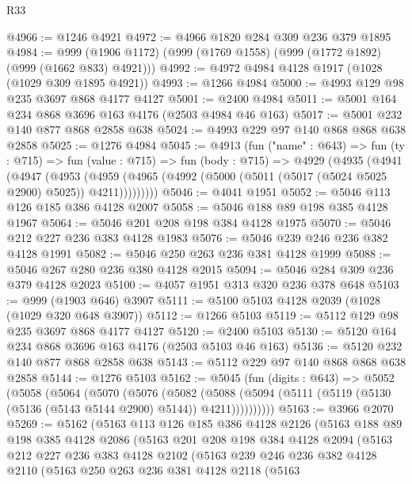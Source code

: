 \begin{lexlean}{R33}
\begin{coremodule}
@4966 := @1246 @4921
@4972 := @4966 @1820 @284 @309 @236 @379 @1895
@4984 := @999 (@1906 @1172) (@999 (@1769 @1558) (@999 (@1772 @1892) (@999 (@1662 @833) @4921)))
@4992 := @4972 @4984 @4128 @1917 (@1028 (@1029 @309 @1895 @4921))
@4993 := @1266 @4984
@5000 := @4993 @129 @98 @235 @3697 @868 @4177 @4127
@5001 := @2400 @4984
@5011 := @5001 @164 @234 @868 @3696 @163 @4176 (@2503 @4984 @46 @163)
@5017 := @5001 @232 @140 @877 @868 @2858 @638
@5024 := @4993 @229 @97 @140 @868 @868 @638 @2858
@5025 := @1276 @4984
@5045 := @4913
    (fun ("name" : @643) =>
    fun (ty : @715) =>
    fun (value : @715) =>
    fun (body : @715) =>
    @4929
      (@4935
        (@4941
          (@4947
            (@4953
              (@4959 (@4965 (@4992 (@5000 (@5011 (@5017 (@5024 @5025 @2900) @5025)) @4211)))))))))
@5046 := @4041 @1951
@5052 := @5046 @113 @126 @185 @386 @4128 @2007
@5058 := @5046 @188 @89 @198 @385 @4128 @1967
@5064 := @5046 @201 @208 @198 @384 @4128 @1975
@5070 := @5046 @212 @227 @236 @383 @4128 @1983
@5076 := @5046 @239 @246 @236 @382 @4128 @1991
@5082 := @5046 @250 @263 @236 @381 @4128 @1999
@5088 := @5046 @267 @280 @236 @380 @4128 @2015
@5094 := @5046 @284 @309 @236 @379 @4128 @2023
@5100 := @4057 @1951 @313 @320 @236 @378 @648
@5103 := @999 (@1903 @646) @3907
@5111 := @5100 @5103 @4128 @2039 (@1028 (@1029 @320 @648 @3907))
@5112 := @1266 @5103
@5119 := @5112 @129 @98 @235 @3697 @868 @4177 @4127
@5120 := @2400 @5103
@5130 := @5120 @164 @234 @868 @3696 @163 @4176 (@2503 @5103 @46 @163)
@5136 := @5120 @232 @140 @877 @868 @2858 @638
@5143 := @5112 @229 @97 @140 @868 @868 @638 @2858
@5144 := @1276 @5103
@5162 := @5045
    (fun (digits : @643) =>
    @5052
      (@5058
        (@5064
          (@5070
            (@5076
              (@5082
                (@5088
                  (@5094 (@5111 (@5119 (@5130 (@5136 (@5143 @5144 @2900) @5144)) @4211))))))))))
@5163 := @3966 @2070
@5269 := @5162
    (@5163
      @113
      @126
      @185
      @386
      @4128
      @2126
      (@5163
        @188
        @89
        @198
        @385
        @4128
        @2086
        (@5163
          @201
          @208
          @198
          @384
          @4128
          @2094
          (@5163
            @212
            @227
            @236
            @383
            @4128
            @2102
            (@5163
              @239
              @246
              @236
              @382
              @4128
              @2110
              (@5163
                @250
                @263
                @236
                @381
                @4128
                @2118
                (@5163

\end{coremodule}
\end{lexlean}
